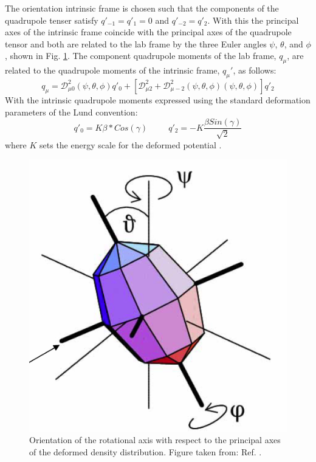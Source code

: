 The orientation intrinsic frame is chosen such that the components of the quadrupole tenser satisfy $q'_{-1}=q'_1=0$ and $q'_{-2}=q'_2$. With this the principal axes of the intrinsic frame coincide with the principal axes of the quadrupole tensor and both are related to the lab frame by the three Euler angles $\psi$, $\theta$, and $\phi$, shown in Fig. \ref{fig:chp2-TAC-euler-angles}. The component quadrupole moments of the lab frame, $q_{\mu}$, are related to the quadrupole moments of the intrinsic frame, $q_{\mu}'$, as follows:
\begin{equation}
\label{eqn:chp2-intrin-quad-to-lab-quad}
q_{\mu} = \mathcal{D}^2_{\mu{}0}(\psi,\theta,\phi)q'_0+\left[\mathcal{D}^2_{\mu{}2}+\mathcal{D}^2_{\mu{}-2}(\psi,\theta,\phi)(\psi,\theta,\phi)\right]q'_2
\end{equation}
With the intrinsic quadrupole moments expressed using the standard deformation parameters of the Lund convention:
\begin{equation}
\label{eqn:chp2-lund-conv-quad-moments}
q'_0=K\beta{}*Cos(\gamma) ~~~~~~~~~~~ q'_2 = -K\frac{\beta{}Sin(\gamma)}{\sqrt{2}}
\end{equation}
where $K$ sets the energy scale for the deformed potential \cite{frauendorfTAC}.
\begin{figure}[t!]
\centerline{\includegraphics[height=0.3\textheight]{./img/c2/tiltorientation.png}}
	\caption{Orientation of the rotational axis with respect to the principal axes of the deformed density distribution. Figure taken from: Ref. \cite{danielDissertation}.\label{fig:chp2-TAC-euler-angles}}
\end{figure}

